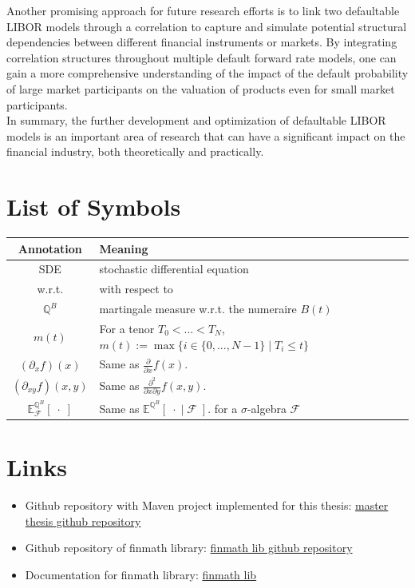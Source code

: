 \documentclass[12pt]{article}
\begin{document}
	Another promising approach for future research efforts is to link two defaultable LIBOR models through a correlation to capture and simulate potential structural dependencies between different financial instruments or markets.
	By integrating correlation structures throughout multiple default forward rate models, one can gain a more comprehensive understanding of the impact of the default probability of large market participants on the valuation of products even for small market participants.\\
	In summary, the further development and optimization of defaultable LIBOR models is an important area of research that can have a significant impact on the financial industry, both theoretically and practically.
	
	
	
	\pagebreak
	\section{List of Symbols}
	\begin{tabular}{cl}
		
		Annotation & Meaning \\
		\hline
		SDE & stochastic differential equation \\
		w.r.t. & with respect to \\
		$\mathbb{Q}^B$ & martingale measure w.r.t. the numeraire $B(t)$\\
		$m(t)$ & For a tenor $T_0 < ... < T_N$, $m(t):= \max\{i \in \{0, ..., N-1\} \; | \; T_i \le t \}$\\
		$(\partial_{x}f)(x)$ & Same as $\frac{\partial}{\partial x}f(x)$.\\
		$(\partial_{x y}f)(x, y)$ & Same as $\frac{\partial^2}{\partial x \partial y}f(x, y)$.\\
		$\mathbb{E}^{\mathbb{Q}^B}_{\mathcal{F}}\left[ \; \cdot \; \right]$ & Same as
		$\mathbb{E}^{\mathbb{Q}^B}\left[ \; \cdot \; | \; \mathcal{F} \; \right].$ for a $\sigma$-algebra $\mathcal{F}$\\
		
	\end{tabular}
	\vspace{1cm}
	\section{Links}
	\begin{itemize}
		\item Github repository with Maven project implemented for this thesis: \href {https://github.com/MarkusParhofer/master-thesis-default-forward-rate-models}{master thesis github repository}
		\item Github repository of finmath library: \href{https://github.com/finmath/finmath-lib}{finmath lib github repository}
		\item Documentation for finmath library: \href{https://www.finmath.net/finmath-lib/}{finmath lib}
	\end{itemize}
\end{document}
